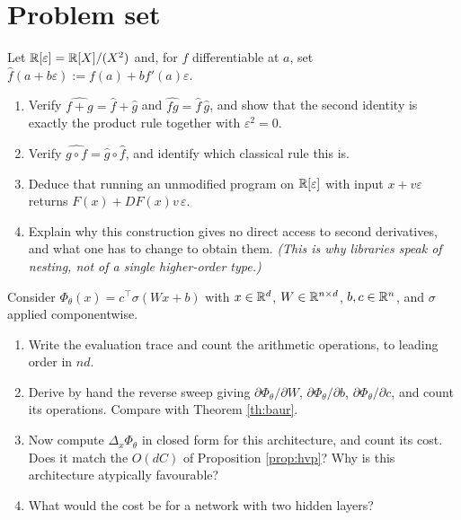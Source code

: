 \documentclass[11pt,a4paper]{article}
\begin{document}
\newpage
\section{Problem set}

\begin{exercise}\label{ex:dual}
Let $\mathbb{R}[\varepsilon] = \mathbb{R}[X]/(X^2)$ and, for $f$ differentiable at $a$, set
$\widehat f(a + b\varepsilon) := f(a) + b f'(a)\varepsilon$.
\begin{enumerate}[label=\textbf{\arabic*.}]
\item Verify $\widehat{f + g} = \widehat f + \widehat g$ and $\widehat{fg} = \widehat f\,\widehat g$,
and show that the second identity is exactly the product rule together with $\varepsilon^2 = 0$.
\item Verify $\widehat{g\circ f} = \widehat g \circ \widehat f$, and identify which classical rule
this is.
\item Deduce that running an unmodified program on $\mathbb{R}[\varepsilon]$ with input $x + v\varepsilon$
returns $F(x) + DF(x)v\,\varepsilon$.
\item Explain why this construction gives no direct access to second derivatives, and what one has to
change to obtain them. \emph{(This is why libraries speak of nesting, not of a single higher-order
type.)}
\end{enumerate}
\end{exercise}

\begin{exercise}\label{ex:reverse}
Consider $\Phi_\theta(x) = c^{\!\top}\sigma(Wx + b)$ with $x \in \mathbb{R}^d$, $W \in \mathbb{R}^{n\times d}$,
$b, c \in \mathbb{R}^n$, and $\sigma$ applied componentwise.
\begin{enumerate}[label=\textbf{\arabic*.}]
\item Write the evaluation trace and count the arithmetic operations, to leading order in $nd$.
\item Derive by hand the reverse sweep giving $\partial \Phi_\theta/\partial W$,
$\partial\Phi_\theta/\partial b$, $\partial\Phi_\theta/\partial c$, and count its operations.
Compare with Theorem \ref{th:baur}.
\item Now compute $\Delta_x \Phi_\theta$ in closed form for this architecture, and count its cost.
Does it match the $O(dC)$ of Proposition \ref{prop:hvp}? Why is this architecture atypically
favourable?
\item What would the cost be for a network with two hidden layers?
\end{enumerate}
\end{exercise}
\end{document}
